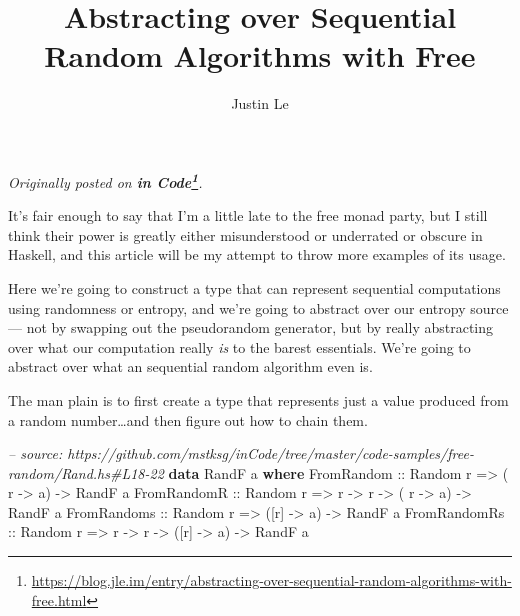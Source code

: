\documentclass[]{article}
\title{Abstracting over Sequential Random Algorithms with Free}
\author{Justin Le}
\newenvironment{Shaded}{}{}
\newcommand{\KeywordTok}[1]{\textcolor[rgb]{0.00,0.44,0.13}{\textbf{{#1}}}}
\newcommand{\DataTypeTok}[1]{\textcolor[rgb]{0.56,0.13,0.00}{{#1}}}
\newcommand{\CommentTok}[1]{\textcolor[rgb]{0.38,0.63,0.69}{\textit{{#1}}}}
\newcommand{\OtherTok}[1]{\textcolor[rgb]{0.00,0.44,0.13}{{#1}}}
\newcommand{\NormalTok}[1]{{#1}}
\renewcommand{\href}[2]{#2\footnote{\url{#1}}}
\begin{document}
\maketitle

\emph{Originally posted on
\textbf{\href{https://blog.jle.im/entry/abstracting-over-sequential-random-algorithms-with-free.html}{in
Code}}.}

It's fair enough to say that I'm a little late to the free monad party, but I
still think their power is greatly either misunderstood or underrated or obscure
in Haskell, and this article will be my attempt to throw more examples of its
usage.

Here we're going to construct a type that can represent sequential computations
using randomness or entropy, and we're going to abstract over our entropy source
--- not by swapping out the pseudorandom generator, but by really abstracting
over what our computation really \emph{is} to the barest essentials. We're going
to abstract over what an sequential random algorithm even is.

The man plain is to first create a type that represents just a value produced
from a random number\ldots{}and then figure out how to chain them.

\begin{Shaded}
\begin{Highlighting}[]
\CommentTok{-- source: https://github.com/mstksg/inCode/tree/master/code-samples/free-random/Rand.hs#L18-22}
\KeywordTok{data} \DataTypeTok{RandF} \NormalTok{a }\KeywordTok{where}
    \DataTypeTok{FromRandom}\OtherTok{   ::} \DataTypeTok{Random} \NormalTok{r }\OtherTok{=>}           \NormalTok{( r  }\OtherTok{->} \NormalTok{a) }\OtherTok{->} \DataTypeTok{RandF} \NormalTok{a}
    \DataTypeTok{FromRandomR}\OtherTok{  ::} \DataTypeTok{Random} \NormalTok{r }\OtherTok{=>} \NormalTok{r }\OtherTok{->} \NormalTok{r }\OtherTok{->} \NormalTok{( r  }\OtherTok{->} \NormalTok{a) }\OtherTok{->} \DataTypeTok{RandF} \NormalTok{a}
    \DataTypeTok{FromRandoms}\OtherTok{  ::} \DataTypeTok{Random} \NormalTok{r }\OtherTok{=>}           \NormalTok{([r] }\OtherTok{->} \NormalTok{a) }\OtherTok{->} \DataTypeTok{RandF} \NormalTok{a}
    \DataTypeTok{FromRandomRs}\OtherTok{ ::} \DataTypeTok{Random} \NormalTok{r }\OtherTok{=>} \NormalTok{r }\OtherTok{->} \NormalTok{r }\OtherTok{->} \NormalTok{([r] }\OtherTok{->} \NormalTok{a) }\OtherTok{->} \DataTypeTok{RandF} \NormalTok{a}
\end{Highlighting}
\end{Shaded}
\end{document}
